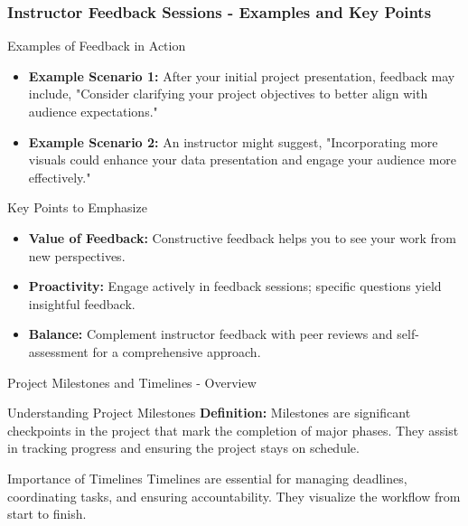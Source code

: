 \documentclass[aspectratio=169]{beamer}
\begin{document}
\begin{frame}[fragile]
    \frametitle{Instructor Feedback Sessions - Examples and Key Points}
    \begin{block}{Examples of Feedback in Action}
        \begin{itemize}
            \item \textbf{Example Scenario 1:} After your initial project presentation, feedback may include, "Consider clarifying your project objectives to better align with audience expectations."
            \item \textbf{Example Scenario 2:} An instructor might suggest, "Incorporating more visuals could enhance your data presentation and engage your audience more effectively."
        \end{itemize}
    \end{block}
    
    \begin{block}{Key Points to Emphasize}
        \begin{itemize}
            \item \textbf{Value of Feedback:} Constructive feedback helps you to see your work from new perspectives.
            \item \textbf{Proactivity:} Engage actively in feedback sessions; specific questions yield insightful feedback.
            \item \textbf{Balance:} Complement instructor feedback with peer reviews and self-assessment for a comprehensive approach.
        \end{itemize}
    \end{block}
\end{frame}

\begin{frame}[fragile]{Project Milestones and Timelines - Overview}
    \begin{block}{Understanding Project Milestones}
        \textbf{Definition:} Milestones are significant checkpoints in the project that mark the completion of major phases. They assist in tracking progress and ensuring the project stays on schedule.
    \end{block}

    \begin{block}{Importance of Timelines}
        Timelines are essential for managing deadlines, coordinating tasks, and ensuring accountability. They visualize the workflow from start to finish.
    \end{block}
\end{frame}
\end{document}
